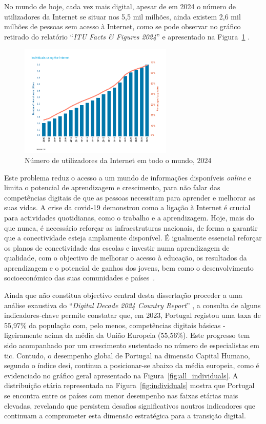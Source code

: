 No mundo de hoje, cada vez mais digital, apesar de em 2024 o número de utilizadores da Internet se situar nos 5,5 mil milhões, ainda existem 2,6 mil milhões de pessoas sem acesso à Internet, como se pode observar no gráfico retirado do relatório ``\textit{ITU Facts \& Figures 2024}'' e apresentado na Figura~\ref{fig:numutilizadoresnet} \cite{broadbandcomission, itu2024facts}.

\begin{figure}[hbtp]
    \centering
    \includegraphics[width=0.65\textwidth]{figures/ITU-InternetUse.png}
    \caption{Número de utilizadores da Internet em todo o mundo, 2024 \cite{itu2024facts}}
    \label{fig:numutilizadoresnet}
\end{figure}
Este problema reduz o acesso a um mundo de informações disponíveis \textit{online} e limita o potencial de aprendizagem e crescimento, para não falar das competências digitais de que as pessoas necessitam para aprender e melhorar as suas vidas.
A crise da \acrshort{covid-19} demonstrou como a ligação à Internet é crucial para actividades quotidianas, como o trabalho e a aprendizagem. Hoje, mais do que nunca, é necessário reforçar as infraestruturas nacionais, de forma a garantir que a conectividade esteja amplamente disponível. É igualmente essencial reforçar os planos de conectividade das escolas e investir numa aprendizagem de qualidade, com o objectivo de melhorar o acesso à educação, os resultados da aprendizagem e o potencial de ganhos dos jovens, bem como o desenvolvimento socioeconómico das suas comunidades e países~\cite{TheDigitransf}.

Ainda que não constitua objectivo central desta dissertação proceder a uma análise exaustiva do ``\textit{Digital Decade 2024 Country Report}'' \cite{DESI2024}, a consulta de alguns indicadores-chave permite constatar que, em 2023, Portugal registou uma taxa de 55,97\% da população com, pelo menos, competências digitais básicas - ligeiramente acima da média da União Europeia (55,56\%). Este progresso tem sido acompanhado por um crescimento sustentado no número de especialistas em \acrfull{tic}.
Contudo, o desempenho global de Portugal na dimensão Capital Humano, segundo o índice \acrfull{desi}, continua a posicionar-se abaixo da média europeia, como é evidenciado no gráfico geral apresentado na Figura~\ref{fig:all_individuals}. A distribuição etária representada na Figura~\ref{fig:individuals} mostra que Portugal se encontra entre os países com menor desempenho nas faixas etárias mais elevadas, revelando que persistem desafios significativos noutros indicadores que continuam a comprometer esta dimensão estratégica para a transição digital.

